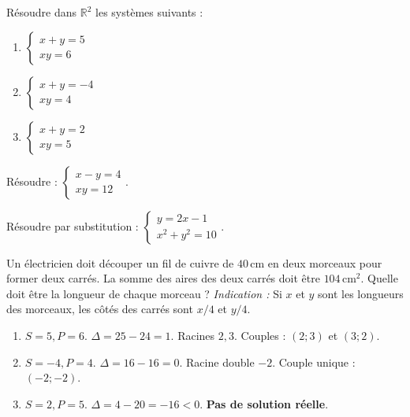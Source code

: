 \documentclass[11pt]{article}
\begin{document}
\begin{exercice}
Résoudre dans $\mathbb{R}^2$ les systèmes suivants :
\begin{enumerate}
    \item $\begin{cases} x+y=5 \\ xy=6 \end{cases}$
    \item $\begin{cases} x+y=-4 \\ xy=4 \end{cases}$
    \item $\begin{cases} x+y=2 \\ xy=5 \end{cases}$
\end{enumerate}
\end{exercice}

\begin{exercice}
Résoudre : $\begin{cases} x - y = 4 \\ xy = 12 \end{cases}$.
\end{exercice}

\begin{exercice}
Résoudre par substitution : $\begin{cases} y = 2x - 1 \\ x^2 + y^2 = 10 \end{cases}$.
\end{exercice}

\begin{exercice}
Un électricien doit découper un fil de cuivre de $40\,\text{cm}$ en deux morceaux pour former deux carrés. La somme des aires des deux carrés doit être $104\,\text{cm}^2$. Quelle doit être la longueur de chaque morceau ?
\emph{Indication :} Si $x$ et $y$ sont les longueurs des morceaux, les côtés des carrés sont $x/4$ et $y/4$.
\end{exercice}

\begin{corrige}[Exercice 1]
\begin{enumerate}
    \item $S=5, P=6$. $\Delta=25-24=1$. Racines $2,3$. Couples : $(2;3)$ et $(3;2)$.
    \item $S=-4, P=4$. $\Delta=16-16=0$. Racine double $-2$. Couple unique : $(-2;-2)$.
    \item $S=2, P=5$. $\Delta=4-20=-16<0$. \textbf{Pas de solution réelle}.
\end{enumerate}
\end{corrige}
\end{document}
